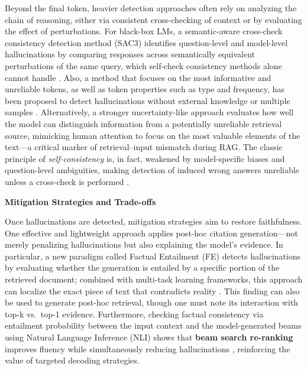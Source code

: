 \documentclass[11pt]{article}
\begin{document}
Beyond the final token, heavier detection approaches often rely on analyzing the chain of reasoning, either via consistent cross-checking of context or by evaluating the effect of perturbations. For black-box LMs, a semantic-aware cross-check consistency detection method (SAC3) identifies question-level and model-level hallucinations by comparing responses across semantically equivalent perturbations of the same query, which self-check consistency methods alone cannot handle \cite{ref144}. Also, a method that focuses on the most informative and unreliable tokens, as well as token properties such as type and frequency, has been proposed to detect hallucinations without external knowledge or multiple samples \cite{ref145}. Alternatively, a stronger uncertainty-like approach evaluates how well the model can distinguish information from a potentially unreliable retrieval source, mimicking human attention to focus on the most valuable elements of the text---a critical marker of retrieval--input mismatch during RAG. The classic principle of \emph{self-consistency} is, in fact, weakened by model-specific biases and question-level ambiguities, making detection of induced wrong answers unreliable unless a cross-check is performed \cite{ref144}.

\textbf{Mitigation Strategies and Trade-offs}

Once hallucinations are detected, mitigation strategies aim to restore faithfulness. One effective and lightweight approach applies post-hoc citation generation---not merely penalizing hallucinations but also explaining the model's evidence. In particular, a new paradigm called Factual Entailment (FE) detects hallucinations by evaluating whether the generation is entailed by a specific portion of the retrieved document; combined with multi-task learning frameworks, this approach can localize the exact piece of text that contradicts reality \cite{ref146}. This finding can also be used to generate post-hoc retrieval, though one must note its interaction with top-k vs.~top-1 evidence. Furthermore, checking factual consistency via entailment probability between the input context and the model-generated beams using Natural Language Inference (NLI) shows that \textbf{beam search re-ranking} improves fluency while simultaneously reducing hallucinations \cite{ref147}, reinforcing the value of targeted decoding strategies.
\end{document}
